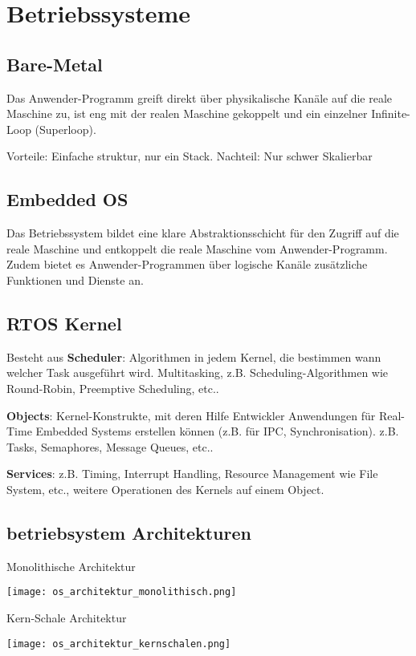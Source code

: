 \section{Betriebssysteme}

\subsection{Bare-Metal}

Das Anwender-Programm greift direkt über physikalische Kanäle auf die reale Maschine zu,
ist eng mit der realen Maschine gekoppelt und ein einzelner Infinite-Loop (Superloop).

Vorteile: Einfache struktur, nur ein Stack.
Nachteil: Nur schwer Skalierbar

\subsection{Embedded OS}
Das Betriebssystem bildet eine klare Abstraktionsschicht für den Zugriff auf die reale Maschine und entkoppelt die reale Maschine vom Anwender-Programm. Zudem bietet es Anwender-Programmen über logische Kanäle zusätzliche Funktionen und Dienste an.

\subsection{RTOS Kernel}

Besteht aus \textbf{Scheduler}: Algorithmen in jedem Kernel, die bestimmen wann welcher Task ausgeführt wird. Multitasking, z.B. Scheduling-Algorithmen wie Round-Robin, Preemptive Scheduling, etc..

\textbf{Objects}: Kernel-Konstrukte, mit deren Hilfe Entwickler Anwendungen für Real-Time Embedded Systems
erstellen können (z.B. für IPC, Synchronisation). z.B. Tasks, Semaphores, Message Queues, etc..

\textbf{Services}: z.B. Timing, Interrupt Handling, Resource Management wie File System, etc., weitere Operationen des Kernels auf einem Object.

\subsection{betriebsystem Architekturen}

\begin{minipage}[t]{.45\linewidth}
	\centering
	Monolithische Architektur

	\texttt{[image: os\_architektur\_monolithisch.png]}
\end{minipage}\hfill
\begin{minipage}[t]{.45\linewidth}
	\centering
	Kern-Schale Architektur

	\texttt{[image: os\_architektur\_kernschalen.png]}
\end{minipage}

